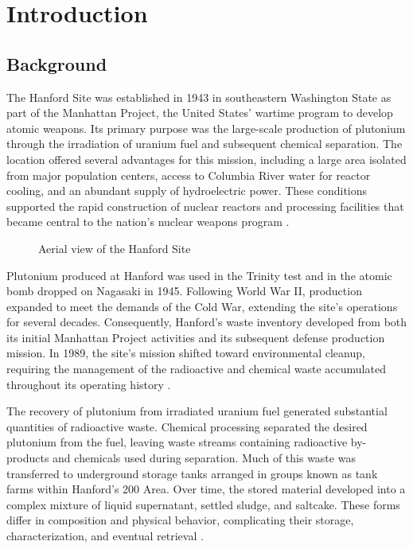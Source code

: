 \chapter{Introduction}
\label{chap:introduction}

\section{Background}
\noindent
The Hanford Site was established in 1943 in southeastern Washington State as part of the Manhattan Project, the United States' wartime program to develop atomic weapons. Its primary purpose was the large-scale production of plutonium through the irradiation of uranium fuel and subsequent chemical separation. The location offered several advantages for this mission, including a large area isolated from major population centers, access to Columbia River water for reactor cooling, and an abundant supply of hydroelectric power. These conditions supported the rapid construction of nuclear reactors and processing facilities that became central to the nation's nuclear weapons program \citep{npsManhattanSiteSelection}.

\begin{figure}[H]
\centering
{}
\caption{Aerial view of the Hanford Site}
\label{fig:Aerial View of the Handford Site}
\end{figure}

Plutonium produced at Hanford was used in the Trinity test and in the atomic bomb dropped on Nagasaki in 1945. Following World War II, production expanded to meet the demands of the Cold War, extending the site's operations for several decades. Consequently, Hanford's waste inventory developed from both its initial Manhattan Project activities and its subsequent defense production mission. In 1989, the site's mission shifted toward environmental cleanup, requiring the management of the radioactive and chemical waste accumulated throughout its operating history \citep{npsHanfordTPlant,doeHanfordCleanup2020}.

The recovery of plutonium from irradiated uranium fuel generated substantial quantities of radioactive waste. Chemical processing separated the desired plutonium from the fuel, leaving waste streams containing radioactive by-products and chemicals used during separation. Much of this waste was transferred to underground storage tanks arranged in groups known as tank farms within Hanford's 200 Area. Over time, the stored material developed into a complex mixture of liquid supernatant, settled sludge, and saltcake. These forms differ in composition and physical behavior, complicating their storage, characterization, and eventual retrieval \citep{doeHanfordTankFarms,gao2008TankManagement}.


